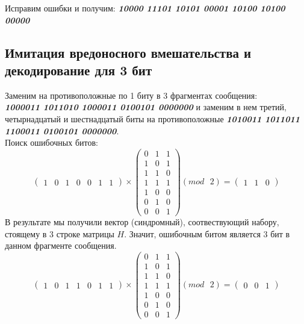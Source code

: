 \documentclass[a5paper, 10pt]{article}
\theoremstyle{definition}
\theoremstyle{plain}
\theoremstyle{remark}
\begin{document}
Исправим ошибки и получим:  \textbf{\textit{10000 11101 10101 00001 10100 10100 00000}}


\subsection{Имитация вредоносного вмешательства и декодирование для 3 бит}

Заменим на противоположные по 1 биту в 3 фрагментах сообщения:\\
 \textbf{\textit{10\colorbox[rgb]{0.50, 0.5, 0.5}{0}0011 101101\colorbox[rgb]{0.50, 0.5, 0.5}{0} 1\colorbox[rgb]{0.50, 0.5, 0.5}{0}00011 0100101 0000000}} и заменим в нем третий, четырнадцатый и шестнадцатый биты на противоположные  \textbf{\textit{10\colorbox[rgb]{0.4, 0.8, 0.8}{1}0011 101101\colorbox[rgb]{0.4, 0.8, 0.8}{1} 1\colorbox[rgb]{0.4, 0.8, 0.8}{1}00011 0100101 0000000}}.\\
Поиск ошибочных битов:
\begin{equation}
\begin{pmatrix}
1 & 0 & 1 & 0 & 0 & 1 & 1
\end{pmatrix}
 \times
\begin{pmatrix}
0 & 1 & 1\\
1 & 0 & 1\\
1 & 1 & 0\\
1 & 1 & 1 \\
1 & 0 & 0\\
0 & 1 & 0 \\
0 & 0 & 1
\end{pmatrix}
(mod \text{ }2)
= \begin{pmatrix}
1 & 1 & 0 
\end{pmatrix}
\end{equation}
В результате мы получили вектор (синдромный), соотвествующий набору, стоящему в 3 строке матрицы $H$. Значит, ошибочным битом является 3 бит в данном фрагменте сообщения.\\
\begin{equation}
\begin{pmatrix}
1 & 0 & 1 & 1 & 0 & 1 & 1
\end{pmatrix}
 \times
\begin{pmatrix}
0 & 1 & 1\\
1 & 0 & 1\\
1 & 1 & 0\\
1 & 1 & 1 \\
1 & 0 & 0\\
0 & 1 & 0 \\
0 & 0 & 1
\end{pmatrix}
(mod \text{ }2)
= \begin{pmatrix}
0 & 0 & 1 
\end{pmatrix}
\end{equation}
\end{document}
